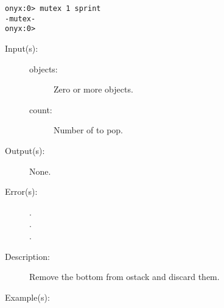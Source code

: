 \begin{description}
\begin{description}
\begin{verbatim}
onyx:0> mutex 1 sprint
-mutex-
onyx:0>
		\end{verbatim}
	\end{description}
\label{systemdict:nbpop}
\item[{\onyxop{objects \dots count}{nbpop}{\dots}}: ]
	\begin{description}\item[]
	\item[Input(s): ]
		\begin{description}\item[]
		\item[objects: ]
			Zero or more objects.
		\item[count: ]
			Number of  to pop.
		\end{description}
	\item[Output(s): ] None.
	\item[Error(s): ]
		\begin{description}\item[]
		\item[.]
		\item[.]
		\item[.]
		\end{description}
	\item[Description: ]
		Remove the bottom   from ostack and
		discard them.
	\item[Example(s): ]\begin{verbatim}


\end{verbatim}
\end{description}
\end{description}
